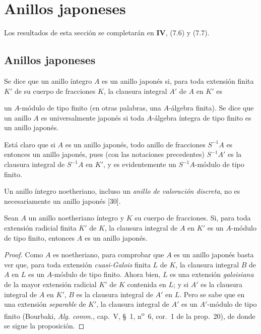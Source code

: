 \section{Anillos japoneses}
\label{section:0.23-es}

Los resultados de esta sección se completarán en \textbf{IV}, (7.6) y (7.7).

\subsection{Anillos japoneses}
\label{subsection:0.23.1-es}

\begin{definition}[23.1.1]
\label{0.23.1.1-es}
Se dice que un anillo íntegro $A$ es un anillo japonés si, para toda
extensión finita $K'$ de su cuerpo de fracciones $K$, la clausura integral
$A'$ de $A$ en $K'$ es


un $A$-módulo de tipo finito \textup{(en otras palabras, una $A$-álgebra} finita\textup{)}. Se dice
que un anillo $A$ es universalmente japonés si toda $A$-álgebra íntegra de
tipo finito es un anillo japonés.
\end{definition}

Está claro que si $A$ es un anillo japonés, todo anillo de fracciones
$S^{-1}A$ es entonces un anillo japonés, pues (con las notaciones precedentes)
$S^{-1}A'$ es la clausura integral de $S^{-1}A$ en $K'$, y es
evidentemente un $S^{-1}A$-módulo de tipo finito.

Un anillo íntegro noetheriano, incluso un \emph{anillo de valoración discreta},
no es necesariamente un anillo japonés [30].

\begin{proposition}[23.1.2]
\label{0.23.1.2-es}
Sean $A$ un anillo noetheriano íntegro y $K$ su cuerpo de fracciones. Si, para
toda extensión \textup{radicial} finita $K'$ de $K$, la clausura integral de $A$
en $K'$ es un $A$-módulo de tipo finito, entonces $A$ es un anillo japonés.
\end{proposition}

\begin{proof}
Como $A$ es noetheriano, para comprobar que $A$ es un anillo japonés basta
ver que, para toda extensión \emph{cuasi-Galois} finita $L$ de $K$, la clausura
integral $B$ de $A$ en $L$ es un $A$-módulo de tipo
finito. Ahora bien, $L$ es
una extensión \emph{galoisiana} de la mayor extensión radicial $K'$ de $K$ contenida
en $L$; y si $A'$ es la clausura integral de $A$ en $K'$, $B$ es la clausura
integral de $A'$ en $L$. Pero se sabe que en una extensión \emph{separable} de $K'$,
la clausura integral de $A'$ es un $A'$-módulo de tipo finito (Bourbaki,
\emph{Alg. comm.}, cap.~V, §~1, n\textsuperscript{o}~6, cor.~1 de la
prop.~20), de donde se sigue la proposición.
\end{proof}

